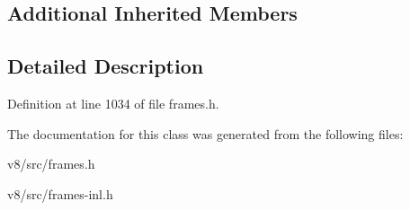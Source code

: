 \subsection*{Additional Inherited Members}


\subsection{Detailed Description}


Definition at line 1034 of file frames.\+h.



The documentation for this class was generated from the following files\+:\begin{DoxyCompactItemize}
\item 
v8/src/frames.\+h\item 
v8/src/frames-\/inl.\+h\end{DoxyCompactItemize}
